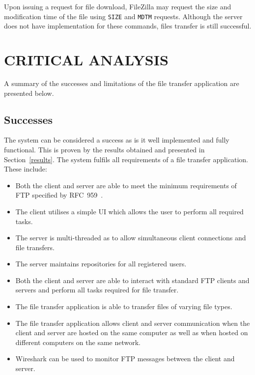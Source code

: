 \documentclass[10pt,twocolumn]{witseiepaper}
\begin{document}
Upon issuing a request for file download, FileZilla may request the size and modification time of the file using \texttt{SIZE} and \texttt{MDTM} requests. Although the server does not have implementation for these commands, files transfer is still successful.

\section{CRITICAL ANALYSIS}

A summary of the successes and limitations of the file transfer application are presented below.

\subsection{Successes}

The system can be considered a success as is it well implemented and fully functional. This is proven by the results obtained and presented in Section~\ref{results}. The system fulfils all requirements of a file transfer application. These include:

\vspace*{-10mm}
\begin{itemize}
	\item Both the client and server are able to meet the minimum requirements of FTP specified by RFC~959~\cite{rfc959}.
	\item The client utilises a simple UI which allows the user to perform all required tasks.
	\item The server is multi-threaded as to allow simultaneous client connections and file transfers.
	\item The server maintains repositories for all registered users.
	\item Both the client and server are able to interact with standard FTP clients and servers and perform all tasks required for file transfer.
	\item The file transfer application is able to transfer files of varying file types.
	\item The file transfer application allows client and server communication when the client and server are hosted on the same computer as well as when hosted on different computers on the same network.
	\item Wireshark can be used to monitor FTP messages between the client and server. 
\end{itemize} 
\vspace*{-10mm}
\end{document}
